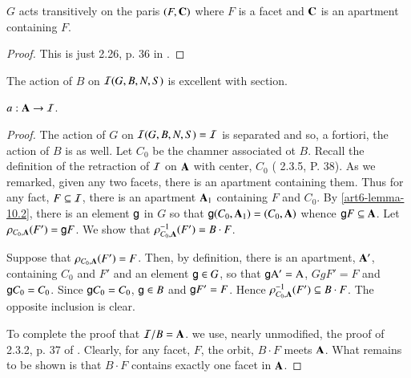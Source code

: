 \begin{lem}\label{art6-lemma-10.2}
$G$ acts transitively on the paris $(F, \mathbf{C})$ where $F$ is a facet and $\mathbf{C}$ is an apartment containing $F$. 
\end{lem}

\begin{proof}
This is just 2.26, p. 36 in \cite{art6-keyBT-I}.
\end{proof}

\begin{prop}\label{art6-proposition-10.3}
The action of $B$ on $\mathcal{I}(G, B, N, S)$ is excellent with section.

$a: \mathbf{A} \rightarrow \mathcal{I}$.
\end{prop}

\begin{proof}
The action of $G$ on $\mathcal{I}(G, B, N, S)= \mathcal{I}$ is separated and so, a fortiori, the action of $B$ is as well. Let $C_{0}$ be the chamner associated ot $B$. Recall the definition of the retraction of $\mathcal{I}$ on $\mathbf{A}$ with center, $C_{0}$ (\cite{art6-keyBT-I} 2.3.5, P. 38). As we remarked, given any two facets, there is an apartment containing them. Thus for any fact, $F\subseteq \mathcal{I}$, there is an apartment $\mathbf{A}_{1}$ containing $F$ and $C_{0}$. By \ref{art6-lemma-10.2}, there is an element $\mathsf{g}$ in $G$ so that $\mathsf{g}(C_{0}, \mathbf{A}_{1}) = (C_{0}, \mathbf{A})$ whence $\mathsf{g} F\subseteq \mathbf{A}$.
Let $\rho_{C_{0},\mathbf{A}}(F') =\mathsf{g} F$. We show that $\rho_{C_{0},\mathbf{A}}^{-1}(F') =B \cdot F$.

Suppose that $\rho_{C_{0},\mathbf{A}}(F') = F$. Then, by definition, there is an apartment, $\mathbf{A}'$, containing $C_{0}$ and $F'$ and an element $\mathsf{g} \in G$, so that $\mathsf{g}\rm A' = \rm A$, $GgF' = F$ and $\mathsf{g} C_{0} = C_{0}$. Since $\mathsf{g} C_{0} =C_{0}$, $\mathsf{g} \in B$ and $\mathsf{g} F' = F$. Hence $\rho_{C_{0},\mathbf{A}}^{-1}(F') \subseteq B \cdot F$. The opposite inclusion is clear.

To complete the proof that $\mathcal{I}/B = \mathbf{A}$. we use, nearly unmodified, the proof of 2.3.2, p. 37 of \cite{art6-keyBT-I}. Clearly, for any facet, $F$, the orbit, $B \cdot F$ meets $\mathbf{A}$. What remains to be shown is that $B \cdot F$ contains exactly one facet in $\mathbf{A}$.


\end{proof}
